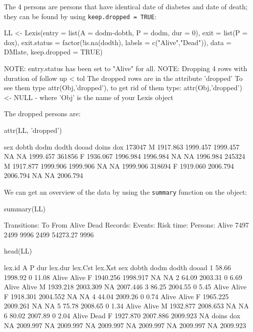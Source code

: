 \begin{enumerate}
The 4 persons are persons that have identical date of diabetes and
date of death; they can be found by using \texttt{keep.dropped =
  TRUE}:
\begin{Schunk}
\begin{Sinput}
 LL <- Lexis(entry = list(A = dodm-dobth,
                          P = dodm,
                        dur = 0),
              exit = list(P = dox),
       exit.status = factor(!is.na(dodth),
                            labels = c("Alive","Dead")),
              data = DMlate,
      keep.dropped = TRUE)
\end{Sinput}
\begin{Soutput}
NOTE: entry.status has been set to "Alive" for all.
NOTE: Dropping  4  rows with duration of follow up < tol
   The dropped rows are in the attribute 'dropped'
   To see them type attr(Obj,'dropped'),
   to get rid of them type: attr(Obj,'dropped') <- NULL
   - where 'Obj' is the name of your Lexis object
\end{Soutput}
\end{Schunk}
The dropped persons are:
\begin{Schunk}
\begin{Sinput}
 attr(LL, 'dropped')
\end{Sinput}
\begin{Soutput}
       sex    dobth     dodm    dodth dooad doins      dox
173047   M 1917.863 1999.457 1999.457    NA    NA 1999.457
361856   F 1936.067 1996.984 1996.984    NA    NA 1996.984
245324   M 1917.877 1999.906 1999.906    NA    NA 1999.906
318694   F 1919.060 2006.794 2006.794    NA    NA 2006.794
\end{Soutput}
\end{Schunk}
We can get an overview of the data by using the \texttt{summary}
function on the object:
\begin{Schunk}
\begin{Sinput}
 summary(LL)
\end{Sinput}
\begin{Soutput}
Transitions:
     To
From    Alive Dead  Records:  Events: Risk time:  Persons:
  Alive  7497 2499      9996     2499   54273.27      9996
\end{Soutput}
\begin{Sinput}
 head(LL)
\end{Sinput}
\begin{Soutput}
 lex.id     A       P dur lex.dur lex.Cst lex.Xst sex    dobth     dodm    dodth    dooad
      1 58.66 1998.92   0   11.08   Alive   Alive   F 1940.256 1998.917       NA       NA
      2 64.09 2003.31   0    6.69   Alive   Alive   M 1939.218 2003.309       NA 2007.446
      3 86.25 2004.55   0    5.45   Alive   Alive   F 1918.301 2004.552       NA       NA
      4 44.04 2009.26   0    0.74   Alive   Alive   F 1965.225 2009.261       NA       NA
      5 75.78 2008.65   0    1.34   Alive   Alive   M 1932.877 2008.653       NA       NA
      6 80.02 2007.89   0    2.04   Alive    Dead   F 1927.870 2007.886 2009.923       NA
 doins      dox
    NA 2009.997
    NA 2009.997
    NA 2009.997
    NA 2009.997
    NA 2009.997
    NA 2009.923
\end{Soutput}
\end{Schunk}


\end{enumerate}
